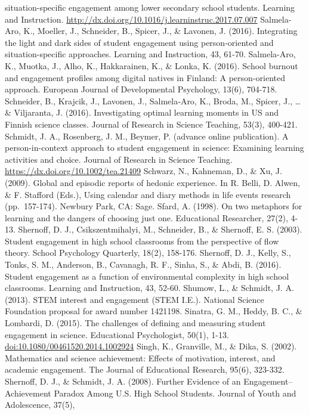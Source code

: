 \documentclass[]{book}
\theoremstyle{definition}
\theoremstyle{definition}
\theoremstyle{definition}
\theoremstyle{remark}
\begin{document}
situation-specific engagement among lower secondary school students.
Learning and Instruction.
\url{http://dx.doi.org/10.1016/j.learninstruc.2017.07.007} Salmela-Aro,
K., Moeller, J., Schneider, B., Spicer, J., \& Lavonen, J. (2016).
Integrating the light and dark sides of student engagement using
person-oriented and situation-specific approaches. Learning and
Instruction, 43, 61-70. Salmela-Aro, K., Muotka, J., Alho, K.,
Hakkarainen, K., \& Lonka, K. (2016). School burnout and engagement
profiles among digital natives in Finland: A person-oriented approach.
European Journal of Developmental Psychology, 13(6), 704-718. Schneider,
B., Krajcik, J., Lavonen, J., Salmela‐Aro, K., Broda, M., Spicer, J.,
\ldots{} \& Viljaranta, J. (2016). Investigating optimal learning
moments in US and Finnish science classes. Journal of Research in
Science Teaching, 53(3), 400-421. Schmidt, J. A., Rosenberg, J. M.,
Beymer, P. (advance online publication). A person-in-context approach to
student engagement in science: Examining learning activities and choice.
Journal of Research in Science Teaching.
\url{https://dx.doi.org/10.1002/tea.21409} Schwarz, N., Kahneman, D., \&
Xu, J. (2009). Global and episodic reports of hedonic experience. In R.
Belli, D. Alwen, \& F. Stafford (Eds.), Using calendar and diary methods
in life events research (pp.~157-174). Newbury Park, CA: Sage. Sfard, A.
(1998). On two metaphors for learning and the dangers of choosing just
one. Educational Researcher, 27(2), 4-13. Shernoff, D. J.,
Csikszentmihalyi, M., Schneider, B., \& Shernoff, E. S. (2003). Student
engagement in high school classrooms from the perspective of flow
theory. School Psychology Quarterly, 18(2), 158-176. Shernoff, D. J.,
Kelly, S., Tonks, S. M., Anderson, B., Cavanagh, R. F., Sinha, S., \&
Abdi, B. (2016). Student engagement as a function of environmental
complexity in high school classrooms. Learning and Instruction, 43,
52-60. Shumow, L., \& Schmidt, J. A. (2013). STEM interest and
engagement (STEM I.E.). National Science Foundation proposal for award
number 1421198. Sinatra, G. M., Heddy, B. C., \& Lombardi, D. (2015).
The challenges of defining and measuring student engagement in science.
Educational Psychologist, 50(1), 1-13.
\url{doi:10.1080/00461520.2014.1002924} Singh, K., Granville, M., \&
Dika, S. (2002). Mathematics and science achievement: Effects of
motivation, interest, and academic engagement. The Journal of
Educational Research, 95(6), 323-332. Shernoff, D. J., \& Schmidt, J. A.
(2008). Further Evidence of an Engagement--Achievement Paradox Among
U.S. High School Students. Journal of Youth and Adolescence, 37(5),
\end{document}
